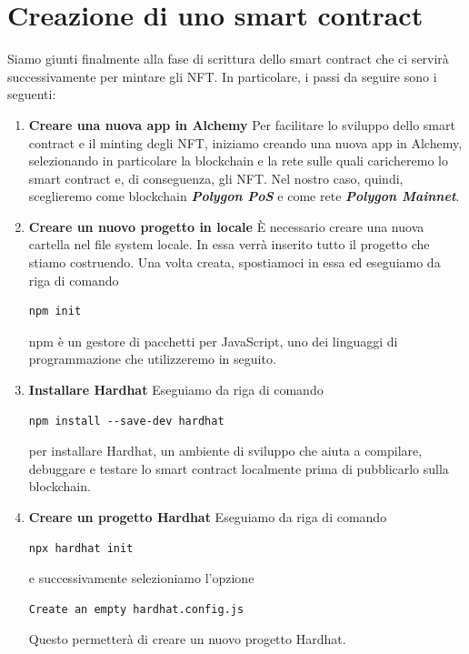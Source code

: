 \documentclass[12pt]{report}
\begin{document}
\section{Creazione di uno smart contract}
\label{sec:contratto}
Siamo giunti finalmente alla fase di scrittura dello smart contract che ci servirà successivamente per mintare gli NFT.\newline
In particolare, i passi da seguire sono i seguenti:
\begin{enumerate}[topsep=5pt, itemsep=0pt]

\item \textbf{Creare una nuova app in Alchemy}\newline
Per facilitare lo sviluppo dello smart contract e il minting degli NFT, iniziamo creando una nuova app in Alchemy, selezionando in particolare la blockchain e la rete sulle quali caricheremo lo smart contract e, di conseguenza, gli NFT.\newline
Nel nostro caso, quindi, sceglieremo come blockchain \textit{\textbf{Polygon PoS}} e come rete \textit{\textbf{Polygon Mainnet}}.

\item \textbf{Creare un nuovo progetto in locale}\newline
È necessario creare una nuova cartella nel file system locale. In essa verrà inserito tutto il progetto che stiamo costruendo.\newline
Una volta creata, spostiamoci in essa ed eseguiamo da riga di comando
\begin{lstlisting}[language=HTML, numbers=none, aboveskip=2pt, belowskip=-3pt]
npm init
\end{lstlisting}
npm è un gestore di pacchetti per JavaScript, uno dei linguaggi di programmazione che utilizzeremo in seguito.

\item \textbf{Installare Hardhat}\newline
Eseguiamo da riga di comando
\begin{lstlisting}[language=HTML, numbers=none, aboveskip=2pt, belowskip=-3pt]
npm install --save-dev hardhat
\end{lstlisting}
per installare Hardhat, un ambiente di sviluppo che aiuta a compilare, debuggare e testare lo smart contract localmente prima di pubblicarlo sulla blockchain.\newpage

\item \textbf{Creare un progetto Hardhat}\newline
Eseguiamo da riga di comando
\begin{lstlisting}[language=HTML, numbers=none, aboveskip=2pt, belowskip=-3pt]
npx hardhat init
\end{lstlisting}
e successivamente selezioniamo l'opzione
\begin{lstlisting}[language=HTML, numbers=none, aboveskip=2pt, belowskip=-3pt]
Create an empty hardhat.config.js
\end{lstlisting}
Questo permetterà di creare un nuovo progetto Hardhat.


\end{enumerate}
\end{document}

